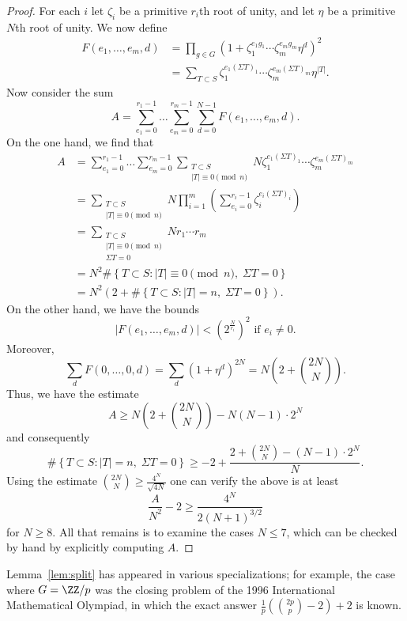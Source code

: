 \begin{proof}
	For each $i$ let $\zeta_i$ be a primitive $r_i$th root of unity,
	and let $\eta$ be a primitive $N$th root of unity.
	We now define
	\begin{align*}
		F(e_1, \dots, e_m, d)
		&= \prod_{g \in G} \left( 1 +
			\zeta_1^{e_1 g_1} \cdots \zeta_m^{e_m g_m} \eta^{d} \right)^2 \\
		&= \sum_{T \subset S}
			\zeta_1^{e_1 (\Sigma T)_1}
			\cdots \zeta_m^{e_m (\Sigma T)_m}
			\eta^{|T|}.
	\end{align*}
	Now consider the sum
	\[ A = \sum_{e_1=0}^{r_1-1} \dots \sum_{e_m=0}^{r_m-1}
		\sum_{d=0}^{N-1} F(e_1, \dots, e_m, d). \]
	On the one hand, we find that
	\begin{align*}
		A &= \sum_{e_1=0}^{r_1-1} \dots \sum_{e_m=0}^{r_m-1}
			\sum_{\substack{T \subset S
				\\ |T| \equiv 0 \pmod n}}
			N \zeta_1^{e_1 (\Sigma T)_1} \cdots \zeta_m^{e_m (\Sigma T)_m} \\
		&= \sum_{\substack{T \subset S
				\\ |T| \equiv 0 \pmod n}}
			N \prod_{i=1}^m \left(  \sum_{e_i=0}^{r_i-1}
				\zeta_i^{e_i (\Sigma T)_i} \right) \\
		&= \sum_{\substack{T \subset S
				\\ |T| \equiv 0 \pmod n \\ \Sigma T = 0}}
			N r_1 \cdots r_m \\
		&= N^2 \# \left\{ T \subset S :
			|T| \equiv 0 \pmod n, \; \Sigma T = 0 \right\} \\
		&= N^2 \left( 2 + \# \left\{ T \subset S :
			|T| = n, \; \Sigma T = 0 \right\} \right).
	\end{align*}
	On the other hand, we have the bounds
	\[ |F(e_1, \dots, e_m, d)| < \left( 2^{\frac{N}{r_i}} \right)^2
		\text{ if } e_i \neq 0. \]
		Moreover,
	\[ \sum_d F(0,\dots,0,d) = \sum_d (1+\eta^d)^{2N}
		= N \left( 2 + \binom{2N}{N} \right). \]
	Thus, we have the estimate
	\[ A \ge N \left( 2 + \binom{2N}{N} \right) - N(N-1) \cdot 2^N \]
	and consequently
	\[
		\# \left\{ T \subset S :
			|T| = n, \; \Sigma T = 0 \right\}
		\ge -2 + \frac{2 + \binom{2N}{N} - (N-1) \cdot 2^N}{N}.
	\]
	Using the estimate $\binom{2N}{N} \ge \frac{4^N}{\sqrt{4N}}$
	one can verify the above is at least
	\[ \frac{A}{N^2}-2 \ge \frac{4^N}{2(N+1)^{3/2}} \]
	for $N \ge 8$.
	All that remains is to examine the cases $N \le 7$,
	which can be checked by hand by explicitly computing $A$.
\end{proof}
\begin{remark*}
	Lemma~\ref{lem:split} has appeared in various specializations;
	for example, the case where $G = \ZZ/p$ was 
	the closing problem of the 1996 International Mathematical Olympiad,
	in which the exact answer
	$\frac1p \left( \binom{2p}{p} -2 \right) + 2$ is known.
\end{remark*}


